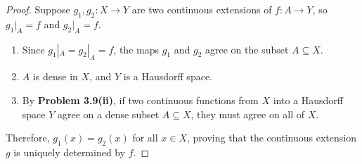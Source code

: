 
\begin{proof}
Suppose $g_1,g_2\colon X\to Y$ are two continuous extensions of $f\colon A\to Y$, so
$g_1|_A=f$ and $g_2|_A=f$.
\begin{enumerate}[label=\arabic*.]
  \item Since $g_1|_A=g_2|_A=f$, the maps $g_1$ and $g_2$ agree on the subset $A\subseteq X$.
  \item $A$ is dense in $X$, and $Y$ is a Hausdorff space.
  \item By \textbf{Problem 3.9(ii)}, if two continuous functions from $X$ into a Hausdorff
        space $Y$ agree on a dense subset $A\subseteq X$, they must agree on all of $X$.
\end{enumerate}
Therefore, $g_1(x)=g_2(x)$ for all $x\in X$, proving that the continuous extension $g$ is
uniquely determined by $f$.
\end{proof}
